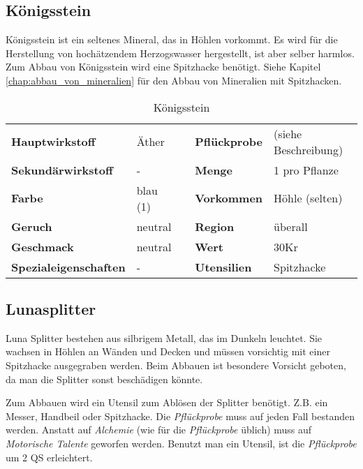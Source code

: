 \subsection{Königsstein}
\label{chap:koenigsstein}
Königsstein ist ein seltenes Mineral, das in Höhlen vorkommt. Es wird für die Herstellung von hochätzendem Herzogswasser hergestellt, ist aber selber harmlos. Zum Abbau von Königsstein wird eine Spitzhacke benötigt. Siehe Kapitel \ref{chap:abbau_von_mineralien} für den Abbau von Mineralien mit Spitzhacken.

\begin{table}[h] 
\begin{center} 
\begin{tabular}{|l|l|p{1cm}|l|l|} 
  	\cline{1-2} \cline{4-5} 
  	\textbf{Hauptwirkstoff} & Äther && \textbf{Pflückprobe} & (siehe Beschreibung) \\ \cline{1-2} \cline{4-5} 
  	\textbf{Sekundärwirkstoff} & - && \textbf{Menge} & 1 pro Pflanze \\ \cline{1-2} \cline{4-5} 
  	\textbf{Farbe} & blau (1) && \textbf{Vorkommen} & Höhle (selten) \\ \cline{1-2} \cline{4-5} 
  	\textbf{Geruch} & neutral && \textbf{Region} & überall \\ \cline{1-2} \cline{4-5} 
  	\textbf{Geschmack} & neutral && \textbf{Wert} & 30Kr \\ \cline{1-2} \cline{4-5} 
  	\textbf{Spezialeigenschaften} & - && \textbf{Utensilien} & Spitzhacke \\ \cline{1-2} \cline{4-5} 
\end{tabular} 
\end{center} 
\caption{Königsstein} 
\label{tab:koenigsstein} 
\end{table}


\subsection{Lunasplitter}
Luna Splitter bestehen aus silbrigem Metall, das im Dunkeln leuchtet. Sie wachsen in Höhlen an Wänden und Decken und müssen vorsichtig mit einer Spitzhacke ausgegraben werden. Beim Abbauen ist besondere Vorsicht geboten, da man die Splitter sonst beschädigen könnte. 

Zum Abbauen wird ein Utensil zum Ablösen der Splitter benötigt. Z.B. ein Messer, Handbeil oder Spitzhacke. Die \textit{Pflückprobe} muss auf jeden Fall bestanden werden. Anstatt auf \textit{Alchemie} (wie für die \textit{Pflückprobe} üblich) muss auf \textit{Motorische Talente} geworfen werden. Benutzt man ein Utensil, ist die \textit{Pflückprobe} um 2 QS erleichtert.

